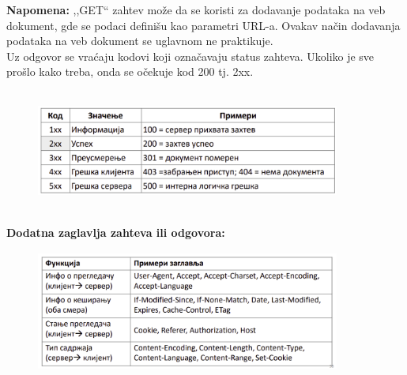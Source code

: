\documentclass[a4paper]{article}
\begin{document}
        \textbf{Napomena:} ,,GET`` zahtev može da se koristi za dodavanje podataka
        na veb dokument, gde se podaci definišu kao parametri URL-a. Ovakav način
        dodavanja podataka na veb dokument se uglavnom ne praktikuje.\\

        Uz odgovor se vraćaju kodovi koji označavaju status zahteva. Ukoliko je sve prošlo
        kako treba, onda se očekuje kod 200 tj. 2xx.
        \begin{figure}[H]
            \begin{center}
                \includegraphics[width=100mm,height=40mm]{Slike/http5.png}
            \end{center}
        \end{figure}
        
        \noindent \textbf{Dodatna zaglavlja zahteva ili odgovora:}
        \begin{figure}[H]
            \begin{center}
                \includegraphics[width=100mm,height=40mm]{Slike/http6.png}
            \end{center}
        \end{figure}
\end{document}
